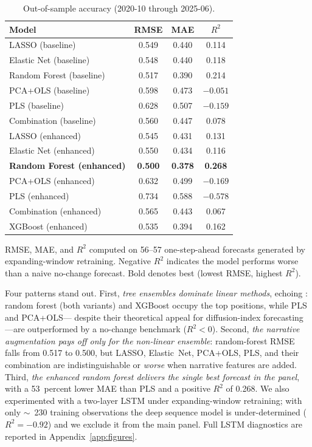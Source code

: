 \documentclass[AER]{AEA}
\begin{document}
\begin{table}[tbp]
\caption{Out-of-sample accuracy (2020-10 through 2025-06).\label{tab:metrics}}
\centering
\begin{tabular}{lccc}
\toprule
Model & RMSE & MAE & $R^2$ \\
\midrule
LASSO (baseline)        & 0.549 & 0.440 & \phantom{$-$}0.114 \\
Elastic Net (baseline)  & 0.548 & 0.440 & \phantom{$-$}0.118 \\
Random Forest (baseline)& 0.517 & 0.390 & \phantom{$-$}0.214 \\
PCA+OLS (baseline)      & 0.598 & 0.473 & $-0.051$ \\
PLS (baseline)          & 0.628 & 0.507 & $-0.159$ \\
Combination (baseline)  & 0.560 & 0.447 & \phantom{$-$}0.078 \\
\addlinespace
LASSO (enhanced)        & 0.545 & 0.431 & \phantom{$-$}0.131 \\
Elastic Net (enhanced)  & 0.550 & 0.434 & \phantom{$-$}0.116 \\
\textbf{Random Forest (enhanced)} & \textbf{0.500} & \textbf{0.378} & \textbf{\phantom{$-$}0.268} \\
PCA+OLS (enhanced)      & 0.632 & 0.499 & $-0.169$ \\
PLS (enhanced)          & 0.734 & 0.588 & $-0.578$ \\
Combination (enhanced)  & 0.565 & 0.443 & \phantom{$-$}0.067 \\
\addlinespace
XGBoost (enhanced)      & 0.535 & 0.394 & \phantom{$-$}0.162 \\
\bottomrule
\end{tabular}
\begin{tablenotes}
RMSE, MAE, and $R^2$ computed on 56--57 one-step-ahead forecasts generated
by expanding-window retraining. Negative $R^2$ indicates the model performs
worse than a naive no-change forecast. Bold denotes best (lowest RMSE,
highest $R^2$).
\end{tablenotes}
\end{table}

Four patterns stand out. First, \emph{tree ensembles dominate linear
methods}, echoing \citet{medeiros2021forecasting}: random forest (both
variants) and XGBoost occupy the top positions, while PLS and PCA+OLS---
despite their theoretical appeal for diffusion-index forecasting---are
outperformed by a no-change benchmark ($R^2 < 0$). Second, \emph{the
narrative augmentation pays off only for the non-linear ensemble}:
random-forest RMSE falls from \num{0.517} to \num{0.500}, but LASSO,
Elastic~Net, PCA+OLS, PLS, and their combination are indistinguishable or
\emph{worse} when narrative features are added. Third, \emph{the enhanced
random forest delivers the single best forecast in the panel}, with a
\num{53}~percent lower MAE than PLS and a positive $R^2$ of \num{0.268}.
We also experimented with a two-layer LSTM under expanding-window retraining;
with only $\sim$~230 training observations the deep sequence model is
under-determined ($R^2=-0.92$) and we exclude it from the main panel.
Full LSTM diagnostics are reported in Appendix~\ref{app:figures}.
\end{document}
